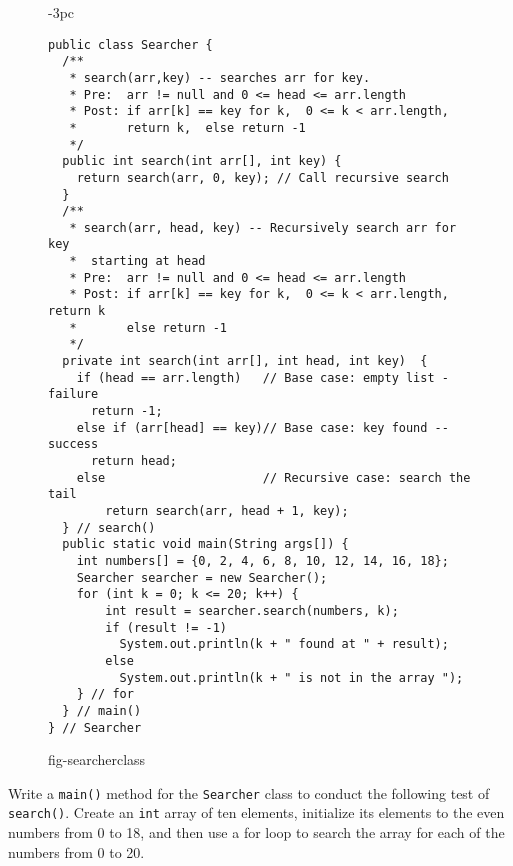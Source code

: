 \begin{figure}[h!]
\jjjprogstart
\begin{jjjlistingleft}[29pc]{-3pc}
\begin{lstlisting}
public class Searcher {
  /**
   * search(arr,key) -- searches arr for key.
   * Pre:  arr != null and 0 <= head <= arr.length
   * Post: if arr[k] == key for k,  0 <= k < arr.length, 
   *       return k,  else return -1
   */
  public int search(int arr[], int key) {
    return search(arr, 0, key); // Call recursive search 
  }
  /**
   * search(arr, head, key) -- Recursively search arr for key
   *  starting at head
   * Pre:  arr != null and 0 <= head <= arr.length
   * Post: if arr[k] == key for k,  0 <= k < arr.length, return k
   *       else return -1
   */
  private int search(int arr[], int head, int key)  {
    if (head == arr.length)   // Base case: empty list - failure
      return -1;
    else if (arr[head] == key)// Base case: key found -- success
      return head;
    else                      // Recursive case: search the tail
        return search(arr, head + 1, key);
  } // search()
  public static void main(String args[]) {
    int numbers[] = {0, 2, 4, 6, 8, 10, 12, 14, 16, 18};
    Searcher searcher = new Searcher();
    for (int k = 0; k <= 20; k++) {
        int result = searcher.search(numbers, k);
        if (result != -1)
          System.out.println(k + " found at " + result);
        else
          System.out.println(k + " is not in the array ");
    } // for
  } // main()
} // Searcher
\end{lstlisting}
\end{jjjlistingleft}
{fig-searcherclass}
\end{figure}


\pagebreak
{}
\begin{SSTUDY}

\item  Write a {\tt main()} method for the {\tt Searcher} class to conduct
the following test of {\tt search()}. Create an {\tt int} array of ten
elements, initialize its elements to the even numbers from 0 to 18,
and then use a for loop to search the array for each of the numbers
from 0 to 20.

\end{SSTUDY}

